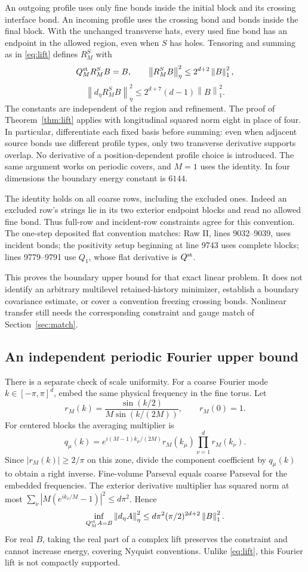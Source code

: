\documentclass[11pt]{article}
\theoremstyle{remark}
\newcommand{\norm}[1]{\left\|#1\right\|}
\begin{document}
An outgoing profile uses only fine bonds inside the initial block
and its crossing interface bond. An incoming profile uses the
crossing bond and bonds inside the final block. With the unchanged
transverse hats, every used fine bond has an endpoint in the allowed
region, even when $S$ has holes. Tensoring and summing as in
\eqref{eq:lift} defines $R_M^S$ with
\begin{equation}\label{eq:boundary-lift}
 Q_M^{\rm st}R_M^S B=B,\qquad
 \norm{R_M^S B}_\eta^2\le2^{d+2}\norm B_1^2,
\end{equation}
\[
 \norm{d_\eta R_M^SB}_\eta^2
 \le2^{d+7}(d-1)\norm B_1^2.
\]
The constants are independent of the region and refinement. The
proof of Theorem~\ref{thm:lift} applies with longitudinal squared
norm eight in place of four. In particular, differentiate each
fixed basis before summing: even when adjacent source bonds use
different profile types, only two transverse derivative supports
overlap. No derivative of a position-dependent profile choice is
introduced. The same argument works on periodic covers, and $M=1$
uses the identity. In four dimensions the boundary energy constant
is $6144$.

The identity holds on all coarse rows, including the excluded ones.
Indeed an excluded row's strings lie in its two exterior endpoint
blocks and read no allowed fine bond. Thus full-row and incident-row
constraints agree for this convention. The one-step deposited flat
convention matches: Raw II, lines 9032--9039, uses incident bonds;
the positivity setup beginning at line 9743 uses complete blocks;
lines 9779--9791 use $Q_1$, whose flat derivative is $Q^{\rm st}$.

This proves the boundary upper bound for that exact linear problem.
It does not identify an arbitrary multilevel retained-history
minimizer, establish a boundary covariance estimate, or cover a
convention freezing crossing bonds. Nonlinear transfer still needs
the corresponding constraint and gauge match of
Section~\ref{sec:match}.

\subsection{An independent periodic Fourier upper bound}

There is a separate check of scale uniformity. For a coarse Fourier
mode $k\in[-\pi,\pi]^d$, embed the same physical frequency in the
fine torus. Let
\[
 r_M(k)=\frac{\sin(k/2)}{M\sin(k/(2M))},\qquad r_M(0)=1.
\]
For centered blocks the averaging multiplier is
\[
 q_\mu(k)=e^{i(M-1)k_\mu/(2M)}r_M(k_\mu)
                              \prod_{\nu=1}^d r_M(k_\nu).
\]
Since $|r_M(k)|\ge2/\pi$ on this zone, divide the component
coefficient by $q_\mu(k)$ to obtain a right inverse. Fine-volume
Parseval equals coarse Parseval for the embedded frequencies. The
exterior derivative multiplier has squared norm at most
$\sum_\nu|M(e^{ik_\nu/M}-1)|^2\le d\pi^2$. Hence
\[
 \inf_{Q_M^{\rm st}A=B}\norm{d_\eta A}_\eta^2
 \le d\pi^2(\pi/2)^{2d+2}\norm B_1^2.
\]
For real $B$, taking the real part of a complex lift preserves the
constraint and cannot increase energy, covering Nyquist conventions.
Unlike \eqref{eq:lift}, this Fourier lift is not compactly supported.
\end{document}
